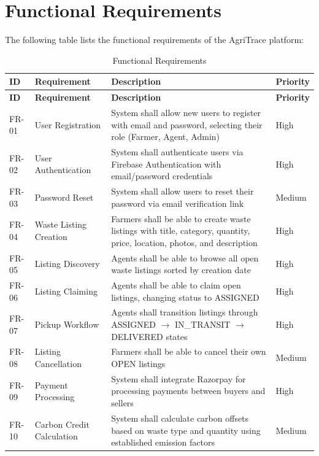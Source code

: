 \documentclass[a4paper,12pt,oneside]{report}
\begin{document}
\section{Functional Requirements}

\noindent The following table lists the functional requirements of the AgriTrace platform:

\begin{longtable}{|p{1cm}|p{3.5cm}|p{7cm}|p{1.5cm}|}
\caption{Functional Requirements} \label{tab:functional-req} \\
\hline
\textbf{ID} & \textbf{Requirement} & \textbf{Description} & \textbf{Priority} \\
\hline
\endfirsthead
\hline
\textbf{ID} & \textbf{Requirement} & \textbf{Description} & \textbf{Priority} \\
\hline
\endhead
FR-01 & User Registration & System shall allow new users to register with email and password, selecting their role (Farmer, Agent, Admin) & High \\
\hline
FR-02 & User Authentication & System shall authenticate users via Firebase Authentication with email/password credentials & High \\
\hline
FR-03 & Password Reset & System shall allow users to reset their password via email verification link & Medium \\
\hline
FR-04 & Waste Listing Creation & Farmers shall be able to create waste listings with title, category, quantity, price, location, photos, and description & High \\
\hline
FR-05 & Listing Discovery & Agents shall be able to browse all open waste listings sorted by creation date & High \\
\hline
FR-06 & Listing Claiming & Agents shall be able to claim open listings, changing status to ASSIGNED & High \\
\hline
FR-07 & Pickup Workflow & Agents shall transition listings through ASSIGNED $\rightarrow$ IN\_TRANSIT $\rightarrow$ DELIVERED states & High \\
\hline
FR-08 & Listing Cancellation & Farmers shall be able to cancel their own OPEN listings & Medium \\
\hline
FR-09 & Payment Processing & System shall integrate Razorpay for processing payments between buyers and sellers & High \\
\hline
FR-10 & Carbon Credit Calculation & System shall calculate carbon offsets based on waste type and quantity using established emission factors & Medium \\

\end{longtable}
\end{document}
